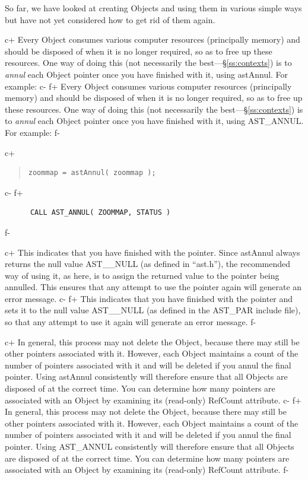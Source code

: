 \documentclass[twoside,11pt]{article}
\newcommand{\secref}[1]{\S\ref{#1}}
\newcommand{\secref}[1]{\ref{#1}}
\begin{document}
So far, we have looked at creating Objects and using them in various
simple ways but have not yet considered how to get rid of them again.

c+
Every Object consumes various computer resources (principally memory)
and should be disposed of when it is no longer required, so as to free
up these resources. One way of doing this (not necessarily the
best---\secref{ss:contexts}) is to {\em{annul}} each Object pointer once
you have finished with it, using astAnnul. For example:
c-
f+
Every Object consumes various computer resources (principally memory)
and should be disposed of when it is no longer required, so as to free
up these resources. One way of doing this (not necessarily the
best---\secref{ss:contexts}) is to {\em{annul}} each Object pointer once
you have finished with it, using AST\_ANNUL. For example:
f-

c+
\begin{quote}
\small
\begin{verbatim}
zoommap = astAnnul( zoommap );
\end{verbatim}
\normalsize
\end{quote}
c-
f+
\small
\begin{verbatim}
      CALL AST_ANNUL( ZOOMMAP, STATUS )
\end{verbatim}
\normalsize
f-

c+
This indicates that you have finished with the pointer. Since astAnnul
always returns the null value AST\_\_NULL (as defined in ``ast.h''),
the recommended way of using it, as here, is to assign the returned
value to the pointer being annulled. This ensures that any attempt to
use the pointer again will generate an error message.
c-
f+
This indicates that you have finished with the pointer and sets it to
the null value AST\_\_NULL (as defined in the AST\_PAR include file),
so that any attempt to use it again will generate an error message.
f-

c+
In general, this process may not delete the Object, because there may
still be other pointers associated with it. However, each Object
maintains a count of the number of pointers associated with it and
will be deleted if you annul the final pointer. Using astAnnul
consistently will therefore ensure that all Objects are disposed of at
the correct time. You can determine how many pointers are associated
with an Object by examining its (read-only) RefCount attribute.
c-
f+
In general, this process may not delete the Object, because there may
still be other pointers associated with it. However, each Object
maintains a count of the number of pointers associated with it and
will be deleted if you annul the final pointer. Using AST\_ANNUL
consistently will therefore ensure that all Objects are disposed of at
the correct time. You can determine how many pointers are associated
with an Object by examining its (read-only) RefCount attribute.
f-
\end{document}
